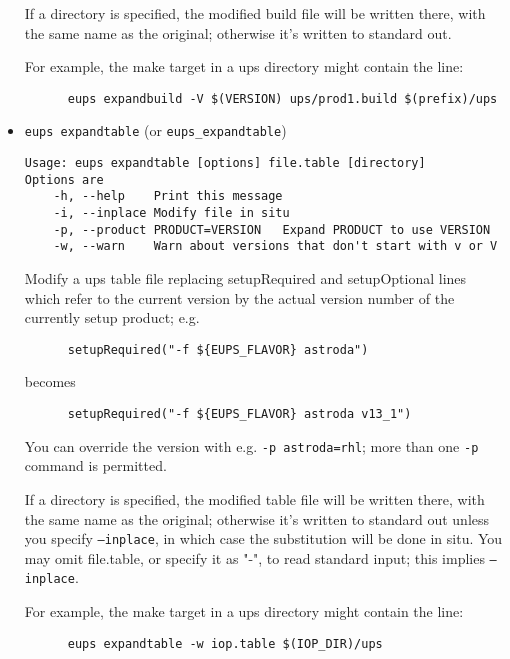 \documentclass{article}
\newcommand{\code}[1]{\texttt{#1}}
\begin{document}
\begin{itemize}
If a directory is specified, the modified build file will be written
there, with the same name as the original; otherwise it's written to
standard out.

For example, the make target in a ups directory might contain the line:
\begin{verbatim}
      eups expandbuild -V $(VERSION) ups/prod1.build $(prefix)/ups
\end{verbatim}				%
  

  \item \code{eups expandtable} (or \code{eups\_expandtable})
\begin{verbatim}
Usage: eups expandtable [options] file.table [directory]
Options are
    -h, --help    Print this message
    -i, --inplace Modify file in situ
    -p, --product PRODUCT=VERSION   Expand PRODUCT to use VERSION
    -w, --warn    Warn about versions that don't start with v or V
\end{verbatim}

Modify a ups table file replacing setupRequired and setupOptional
lines which refer to the current version by the actual version number
of the currently setup product; e.g.
\begin{verbatim}
      setupRequired("-f ${EUPS_FLAVOR} astroda")
\end{verbatim}
becomes
\begin{verbatim}
      setupRequired("-f ${EUPS_FLAVOR} astroda v13_1")
\end{verbatim}
You can override the version with e.g. \code{-p astroda=rhl}; more
than one \code{-p} command is permitted.

If a directory is specified, the modified table file will be written
there, with the same name as the original; otherwise it's written to
standard out unless you specify \code{--inplace}, in which case the
substitution will be done in situ.
You may omit file.table, or specify it as "-", to read standard input;
this implies \code{--inplace}.

For example, the make target in a ups directory might contain the line:
\begin{verbatim}
      eups expandtable -w iop.table $(IOP_DIR)/ups
\end{verbatim}				%



\end{itemize}
\end{document}
